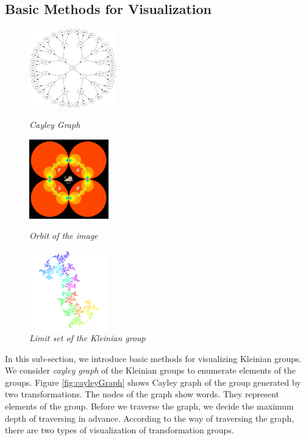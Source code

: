 \subsection{Basic Methods for Visualization}

\begin{figure}[htbp]
 \begin{minipage}[t]{0.333\hsize}
  \center
  \includegraphics[height=1.35in, keepaspectratio]{img/cayleyGraph.png}
  \caption{\textit{Cayley Graph}}
  \label{fig:cayleyGraph}
  \hspace*{\fill}
 \end{minipage}
 \begin{minipage}[t]{0.333\hsize}
  \center
  \includegraphics[height=1.35in, keepaspectratio]{img/preparation/basic/catOrbit.png}
  \caption{\textit{Orbit of the image}}
  \label{fig:orbitCat}
  \hspace*{\fill}
 \end{minipage}
 \begin{minipage}[t]{0.333\hsize}
  \center
  \includegraphics[height=1.35in, keepaspectratio]{img/preparation/limitSet/limit.png}
  \caption{\textit{Limit set of the Kleinian group}}
  \label{fig:limit}
  \hspace*{\fill}
 \end{minipage}
\end{figure}

\noindent In this sub-section, we introduce basic methods for visualizing Kleinian groups.
We consider \textit{cayley graph} of the Kleinian groups to enumerate elements
of the groups.
Figure \ref{fig:cayleyGraph} shows Cayley graph of the group generated
by two transformations.
The nodes of the graph show words.
They represent elements of the group.
Before we traverse the graph, we decide the maximum depth of traversing in advance.
According to the way of traversing the graph, 
there are two types of visualization of transformation groups.

